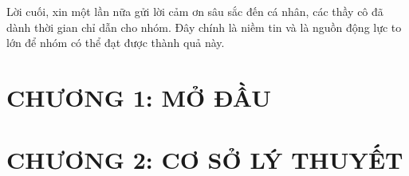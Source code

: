 \documentclass[12pt,a4paper]{article}
\begin{document}
Lời cuối, xin một lần nữa gửi lời cảm ơn sâu sắc đến cá nhân, các thầy cô đã dành thời gian chỉ dẫn cho nhóm. Đây chính là niềm tin và là nguồn động lực to lớn để nhóm có thể đạt được thành quả này.

\newpage
\tableofcontents

\newpage
{}
\section*{CHƯƠNG 1: MỞ ĐẦU}

\newpage
{}
\section*{CHƯƠNG 2: CƠ SỞ LÝ THUYẾT}
\setcounter{section}{2}
\end{document}
